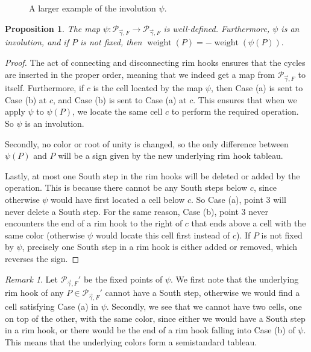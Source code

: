 \documentclass[a4paper,12pt]{amsart}
\theoremstyle{plain}
\newtheorem{proposition}[theorem]{Proposition}
\theoremstyle{definition}
\theoremstyle{remark}
\newtheorem{remark}[theorem]{Remark}
\DeclareMathOperator{\weight}{weight}
\begin{document}
\begin{figure}
\begin{center}
\end{center}
\caption{A larger example of the involution $\psi$.}
\label{figure:involution_example_2}
\end{figure}
\begin{proposition}
The map $\psi: \mathcal{P}_{\vec{\gamma},F} \rightarrow \mathcal{P}_{\vec{\gamma},F} $ is well-defined. Furthermore, $\psi$ is an involution, and if $P$ is not fixed, then $\weight(P) = - \weight(\psi(P)).$ 
\end{proposition}
\begin{proof}
The act of connecting and disconnecting rim hooks ensures that the cycles are inserted in the proper order, meaning that we indeed get a map from $\mathcal{P}_{\vec{\gamma},F}$ to itself. Furthermore, if $c$ is the cell located by the map $\psi$, then Case (a) is sent to Case (b) at $c$, and Case (b) is sent to Case (a) at $c$. This ensures that when we apply $\psi$ to $\psi(P)$, we locate the same cell $c$ to perform the required operation. So $\psi$ is an involution.

Secondly, no color or root of unity is changed, so the only difference between $\psi(P)$ and $P$ will be a sign given by the new underlying rim hook tableau.

Lastly, at most one South step in the rim hooks will be deleted or added by the operation. This is because there cannot be any South steps below $c$, since otherwise $\psi$ would have first located a cell below $c$. So Case (a), point 3 will never delete a South step. For the same reason, Case (b), point 3 never encounters the end of a rim hook to the right of $c$ that ends above a cell with the same color (otherwise $\psi$ would locate this cell first instead of $c$).
If $P$ is not fixed by $\psi$, precisely one South step in a rim hook is either added or removed, which reverses the sign.
\end{proof}
\begin{remark}\label{remark:P_prime_semistandard}
Let $\mathcal{P}_{\vec{\gamma},F}'$ be the fixed points of $\psi$. We first note that the underlying rim hook of any $P \in \mathcal{P}_{\vec{\gamma},F}'$ cannot have a South step, otherwise we would find a cell satisfying Case (a) in $\psi$. Secondly, we see that we cannot have two cells, one on top of the other, with the same color, since either we would have a South step in a rim hook, or there would be the end of a rim hook falling into Case (b) of $\psi$.
This means that the underlying colors form a semistandard tableau. 
\end{remark}
\end{document}
